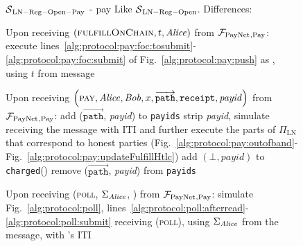 \begin{figure}[!htbp]
  \begin{simulatorbox}{$\mathcal{S}{}_{\mathrm{LN - Reg - Open - Pay}}$ - pay}
    Like $\mathcal{S}{}_{\mathrm{LN - Reg - Open}}$. Differences:
    \begin{algorithmic}[1]
      \State Upon receiving $\left(\textsc{fulfillOnChain}, t, \mathit{Alice}\right)$
      from $\mathcal{F}_{\mathrm{PayNet}}{}_{\mathrm{, Pay}}$:
      \label{alg:sim:pay:foc:top}
      \Indent
        \State execute
        lines~\ref{alg:protocol:pay:foc:tosubmit}-\ref{alg:protocol:pay:foc:submit}
        of Fig.~\ref{alg:protocol:pay:push} as \alice{}, using $t$ from message
        \label{alg:sim:pay:foc:run}
      \EndIndent
      \Statex

      \State Upon receiving $\left(\textsc{pay}, \mathit{Alice}, \mathit{Bob}, x,
      \overrightarrow{\mathtt{path}}, \mathtt{receipt}, \mathit{payid}\right)$
      from $\mathcal{F}_{\mathrm{PayNet}}{}_{\mathrm{, Pay}}$:
      \Indent
        \State add ($\overrightarrow{\mathtt{path}}$, \textit{payid}) to
        \texttt{payids}
        \State strip \textit{payid}, simulate receiving the message with
        \alice{} ITI and further execute the parts of $\Pi_{\mathrm{LN}}$ that
        correspond to honest parties (Fig.~\ref{alg:protocol:pay:outofband}-
        Fig.~\ref{alg:protocol:pay:updateFulfillHtlc})
        \label{alg:sim:pay:simulate}
         
          \State add $\left(\bot, \mathit{payid}\right)$ to
          \texttt{charged}(\alice)
          \State remove ($\overrightarrow{\mathtt{path}}$, \textit{payid}) from
          \texttt{payids}
        \EndIf
      \EndIndent
      \Statex

      \State Upon receiving (\textsc{poll}, $\Sigma_{\mathit{Alice}}$, \alice) from
      $\mathcal{F}_{\mathrm{PayNet}}{}_{\mathrm{, Pay}}$:
      \Indent
        \State simulate Fig.~\ref{alg:protocol:poll},
        lines~\ref{alg:protocol:poll:afterread}-\ref{alg:protocol:poll:submit}
        receiving (\textsc{poll}), using $\Sigma_{\mathit{Alice}}$ from the message,
        with \alice's ITI
        \label{alg:sim:poll:run}
      \EndIndent
    \end{algorithmic}
  \end{simulatorbox}
  \caption{}
  \label{alg:sim:pay}
\end{figure}

